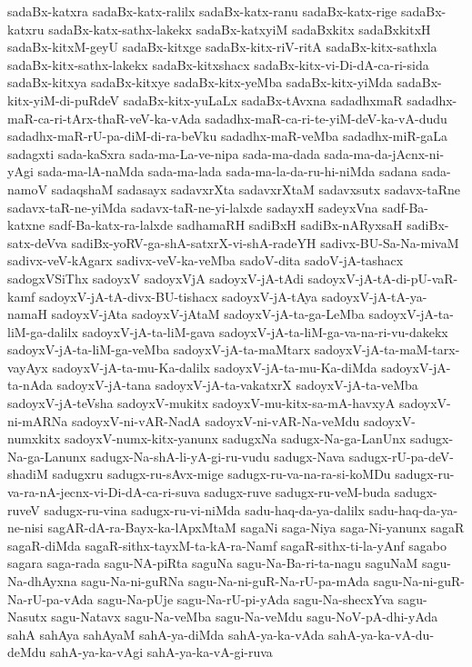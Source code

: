 {sadaBx-katxra
sadaBx-katx-ralilx
sadaBx-katx-ranu
sadaBx-katx-rige
sadaBx-katxru
sadaBx-katx-sathx-lakekx
sadaBx-katxyiM
sadaBxkitx
sadaBxkitxH
sadaBx-kitxM-geyU
sadaBx-kitxge
sadaBx-kitx-riV-ritA
sadaBx-kitx-sathxla
sadaBx-kitx-sathx-lakekx
sadaBx-kitxshacx
sadaBx-kitx-vi-Di-dA-ca-ri-sida
sadaBx-kitxya
sadaBx-kitxye
sadaBx-kitx-yeMba
sadaBx-kitx-yiMda
sadaBx-kitx-yiM-di-puRdeV
sadaBx-kitx-yuLaLx
sadaBx-tAvxna
sadadhxmaR
sadadhx-maR-ca-ri-tArx-thaR-veV-ka-vAda
sadadhx-maR-ca-ri-te-yiM-deV-ka-vA-dudu
sadadhx-maR-rU-pa-diM-di-ra-beVku
sadadhx-maR-veMba
sadadhx-miR-gaLa
sadagxti
sada-kaSxra
sada-ma-La-ve-nipa
sada-ma-dada
sada-ma-da-jAcnx-ni-yAgi
sada-ma-lA-naMda
sada-ma-lada
sada-ma-la-da-ru-hi-niMda
sadana
sada-namoV
sadaqshaM
sadasayx
sadavxrXta
sadavxrXtaM
sadavxsutx
sadavx-taRne
sadavx-taR-ne-yiMda
sadavx-taR-ne-yi-lalxde
sadayxH
sadeyxVna
sadf-Ba-katxne
sadf-Ba-katx-ra-lalxde
sadhamaRH
sadiBxH
sadiBx-nARyxsaH
sadiBx-satx-deVva
sadiBx-yoRV-ga-shA-satxrX-vi-shA-radeYH
sadivx-BU-Sa-Na-mivaM
sadivx-veV-kAgarx
sadivx-veV-ka-veMba
sadoV-dita
sadoV-jA-tashacx
sadogxVSiThx
sadoyxV
sadoyxVjA
sadoyxV-jA-tAdi
sadoyxV-jA-tA-di-pU-vaR-kamf
sadoyxV-jA-tA-divx-BU-tishacx
sadoyxV-jA-tAya
sadoyxV-jA-tA-ya-namaH
sadoyxV-jAta
sadoyxV-jAtaM
sadoyxV-jA-ta-ga-LeMba
sadoyxV-jA-ta-liM-ga-dalilx
sadoyxV-jA-ta-liM-gava
sadoyxV-jA-ta-liM-ga-va-na-ri-vu-dakekx
sadoyxV-jA-ta-liM-ga-veMba
sadoyxV-jA-ta-maMtarx
sadoyxV-jA-ta-maM-tarx-vayAyx
sadoyxV-jA-ta-mu-Ka-dalilx
sadoyxV-jA-ta-mu-Ka-diMda
sadoyxV-jA-ta-nAda
sadoyxV-jA-tana
sadoyxV-jA-ta-vakatxrX
sadoyxV-jA-ta-veMba
sadoyxV-jA-teVsha
sadoyxV-mukitx
sadoyxV-mu-kitx-sa-mA-havxyA
sadoyxV-ni-mARNa
sadoyxV-ni-vAR-NadA
sadoyxV-ni-vAR-Na-veMdu
sadoyxV-numxkitx
sadoyxV-numx-kitx-yanunx
sadugxNa
sadugx-Na-ga-LanUnx
sadugx-Na-ga-Lanunx
sadugx-Na-shA-li-yA-gi-ru-vudu
sadugx-Nava
sadugx-rU-pa-deV-shadiM
sadugxru
sadugx-ru-sAvx-mige
sadugx-ru-va-na-ra-si-koMDu
sadugx-ru-va-ra-nA-jecnx-vi-Di-dA-ca-ri-suva
sadugx-ruve
sadugx-ru-veM-buda
sadugx-ruveV
sadugx-ru-vina
sadugx-ru-vi-niMda
sadu-haq-da-ya-dalilx
sadu-haq-da-ya-ne-nisi
sagAR-dA-ra-Bayx-ka-lApxMtaM
sagaNi
saga-Niya
saga-Ni-yanunx
sagaR
sagaR-diMda
sagaR-sithx-tayxM-ta-kA-ra-Namf
sagaR-sithx-ti-la-yAnf
sagabo
sagara
saga-rada
sagu-NA-piRta
saguNa
sagu-Na-Ba-ri-ta-nagu
saguNaM
sagu-Na-dhAyxna
sagu-Na-ni-guRNa
sagu-Na-ni-guR-Na-rU-pa-mAda
sagu-Na-ni-guR-Na-rU-pa-vAda
sagu-Na-pUje
sagu-Na-rU-pi-yAda
sagu-Na-shecxYva
sagu-Nasutx
sagu-Natavx
sagu-Na-veMba
sagu-Na-veMdu
sagu-NoV-pA-dhi-yAda
sahA
sahAya
sahAyaM
sahA-ya-diMda
sahA-ya-ka-vAda
sahA-ya-ka-vA-du-deMdu
sahA-ya-ka-vAgi
sahA-ya-ka-vA-gi-ruva
}
